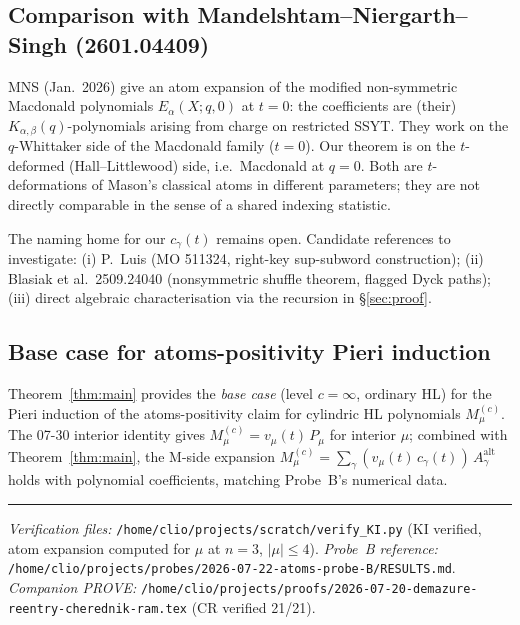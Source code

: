 \documentclass[11pt]{article}
\theoremstyle{definition}
\begin{document}
\subsection{Comparison with Mandelshtam--Niergarth--Singh (2601.04409)}

MNS (Jan.\ 2026) give an atom expansion of the modified non-symmetric
Macdonald polynomials $E_\alpha(X; q, 0)$ at $t = 0$: the coefficients
are (their) $K_{\alpha, \beta}(q)$-polynomials arising from charge on
restricted SSYT. They work on the $q$-Whittaker side of the Macdonald
family ($t = 0$). Our theorem is on the $t$-deformed (Hall--Littlewood)
side, i.e.\ Macdonald at $q = 0$. Both are $t$-deformations of Mason's
classical atoms in different parameters; they are not directly comparable
in the sense of a shared indexing statistic.

The naming home for our $c_\gamma(t)$ remains open. Candidate
references to investigate: (i) P.\ Luis (MO 511324, right-key
sup-subword construction);  (ii) Blasiak et al.\ 2509.24040 (nonsymmetric
shuffle theorem, flagged Dyck paths); (iii) direct algebraic characterisation
via the recursion in \S\ref{sec:proof}.

\subsection{Base case for atoms-positivity Pieri induction}

Theorem~\ref{thm:main} provides the \emph{base case} (level $c = \infty$,
ordinary HL) for the Pieri induction of the atoms-positivity claim for
cylindric HL polynomials $M^{(c)}_\mu$. The 07-30 interior identity gives
$M^{(c)}_\mu = v_\mu(t)\, P_\mu$ for interior $\mu$; combined with
Theorem~\ref{thm:main}, the M-side expansion
$M^{(c)}_\mu = \sum_\gamma (v_\mu(t)\, c_\gamma(t))\, A^{\mathrm{alt}}_\gamma$
holds with polynomial coefficients, matching Probe~B's numerical data.

\bigskip

\noindent\rule{\linewidth}{0.4pt}\medskip

\noindent\emph{Verification files:}
\texttt{/home/clio/projects/scratch/verify\_KI.py} (KI verified, atom
expansion computed for $\mu$ at $n=3$, $|\mu| \le 4$).
\emph{Probe~B reference:}
\texttt{/home/clio/projects/probes/2026-07-22-atoms-probe-B/RESULTS.md}.
\emph{Companion PROVE:}
\texttt{/home/clio/projects/proofs/2026-07-20-demazure-reentry-cherednik-ram.tex}
(CR verified 21/21).
\end{document}
